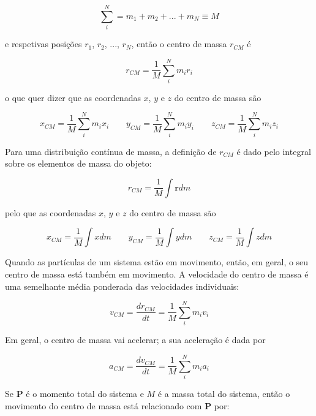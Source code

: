 $$
\sum_{i}^{N}=m_1+m_2+...+m_N\equiv M
$$

e respetivas posições $r_1$, $r_2$, ..., $r_N$, então o centro de massa $r_{CM}$ é

\begin{equation}\label{eq:centro_massa}
    r_{CM}=\frac{1}{M}\sum_{i}^{N}m_ir_i
\end{equation}

o que quer dizer que as coordenadas $x$, $y$ e $z$ do centro de massa são

\begin{equation}\label{eq:centro_massa_coordenadas}
    x_{CM}=\frac{1}{M}\sum_{i}^{N}m_ix_i \qquad y_{CM}=\frac{1}{M}\sum_{i}^{N}m_iy_i \qquad z_{CM}=\frac{1}{M}\sum_{i}^{N}m_iz_i
\end{equation}

Para uma distribuição contínua de massa, a definição de $r_{CM}$ é dado pelo integral sobre os elementos de massa do objeto:

\begin{equation}\label{eq:centro_massa_cont}
    r_{CM}=\frac{1}{M}\int \mathbf{r}dm
\end{equation}

pelo que as coordenadas $x$, $y$ e $z$ do centro de massa são

\begin{equation}\label{eq:centro_massa_cont_coordenadas}
    x_{CM}=\frac{1}{M}\int xdm \qquad y_{CM}=\frac{1}{M}\int ydm \qquad z_{CM}=\frac{1}{M}\int zdm
\end{equation}

Quando as partículas de um sistema estão em movimento, então, em geral, o seu centro de massa está também em movimento. A velocidade do centro de massa é uma semelhante média ponderada das velocidades individuais:

\begin{equation}\label{eq:centro_massa_velocidade}
    v_{CM}=\frac{dr_{CM}}{dt}=\frac{1}{M}\sum_{i}^{N}m_iv_i
\end{equation}

Em geral, o centro de massa vai acelerar; a sua aceleração é dada por

\begin{equation}\label{eq:centro_massa_aceleração}
    a_{CM}=\frac{dv_{CM}}{dt}=\frac{1}{M}\sum_{i}^{N}m_ia_i
\end{equation}

Se $\mathbf{P}$ é o momento total do sistema e $M$ é a massa total do sistema, então o movimento do centro de massa está relacionado com $\mathbf{P}$ por:


